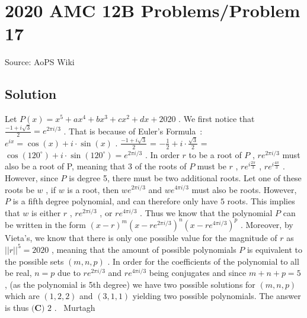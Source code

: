 \documentclass[12pt]{article}
\begin{document}
\section*{{2020 AMC 12B Problems/Problem 17}}
Source: AoPS Wiki

\subsection*{Solution}
Let $P(x) = x^5+ax^4+bx^3+cx^2+dx+2020$ . We first notice that $\frac{-1+i\sqrt{3}}{2} = e^{2\pi i / 3}$ . That is because of Euler's Formula : $e^{ix} = \cos(x) + i \cdot \sin(x)$ . $\frac{-1+i\sqrt{3}}{2}$ = $-\frac{1}{2} + i \cdot \frac {\sqrt{3}}{2}$ = $\cos(120^\circ) + i \cdot \sin(120^\circ) = e^{ 2\pi i / 3}$ . In order $r$ to be a root of $P$ , $re^{2\pi i / 3}$ must also be a root of P, meaning that 3 of the roots of $P$ must be $r$ , $re^{i\frac{2\pi}{3}}$ , $re^{i\frac{4\pi}{3}}$ . However, since $P$ is degree 5, there must be two additional roots. Let one of these roots be $w$ , if $w$ is a root, then $we^{2\pi i / 3}$ and $we^{4\pi i / 3}$ must also be roots. However, $P$ is a fifth degree polynomial, and can therefore only have $5$ roots. This implies that $w$ is either $r$ , $re^{2\pi i / 3}$ , or $re^{4\pi i / 3}$ . Thus we know that the polynomial $P$ can be written in the form $(x-r)^m(x-re^{2\pi i / 3})^n(x-re^{4\pi i / 3})^p$ . Moreover, by Vieta's, we know that there is only one possible value for the magnitude of $r$ as $||r||^5 = 2020$ , meaning that the amount of possible polynomials $P$ is equivalent to the possible sets $(m,n,p)$ . In order for the coefficients of the polynomial to all be real, $n = p$ due to $re^{2\pi i / 3}$ and $re^{4 \pi i / 3}$ being conjugates and since $m+n+p = 5$ , (as the polynomial is 5th degree) we have two possible solutions for $(m, n, p)$ which are $(1,2,2)$ and $(3,1,1)$ yielding two possible polynomials. The answer is thus $\boxed{\textbf{(C) } 2}$ . ~Murtagh
\end{document}

